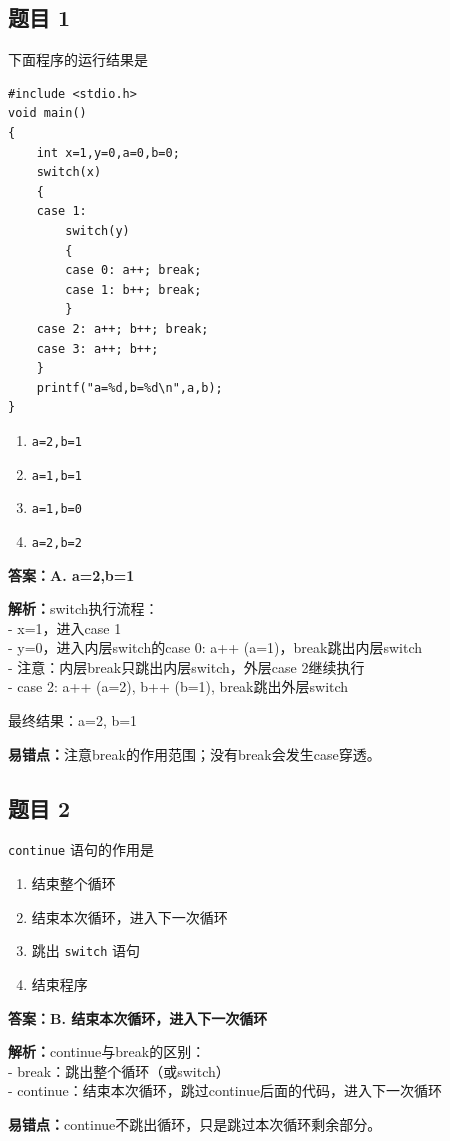 \documentclass[12pt,a4paper]{ctexart}
\begin{document}
\subsection*{题目 1}
下面程序的运行结果是
\begin{lstlisting}
#include <stdio.h>
void main()
{
    int x=1,y=0,a=0,b=0;
    switch(x)
    {
    case 1:
        switch(y)
        {
        case 0: a++; break;
        case 1: b++; break;
        }
    case 2: a++; b++; break;
    case 3: a++; b++;
    }
    printf("a=%d,b=%d\n",a,b);
}
\end{lstlisting}

\begin{enumerate}[label=\Alph*.]
	\item \texttt{a=2,b=1}
	\item \texttt{a=1,b=1}
	\item \texttt{a=1,b=0}
	\item \texttt{a=2,b=2}
\end{enumerate}

\begin{answerbox}
	\textbf{答案：A. a=2,b=1}

	\textbf{解析：}switch执行流程：\\
	- x=1，进入case 1\\
	- y=0，进入内层switch的case 0: a++ (a=1)，break跳出内层switch\\
	- 注意：内层break只跳出内层switch，外层case 2继续执行\\
	- case 2: a++ (a=2), b++ (b=1), break跳出外层switch

	最终结果：a=2, b=1

	\textbf{易错点：}注意break的作用范围；没有break会发生case穿透。
\end{answerbox}

\subsection*{题目 2}
\texttt{continue} 语句的作用是
\begin{enumerate}[label=\Alph*.]
	\item 结束整个循环
	\item 结束本次循环，进入下一次循环
	\item 跳出 \texttt{switch} 语句
	\item 结束程序
\end{enumerate}

\begin{answerbox}
	\textbf{答案：B. 结束本次循环，进入下一次循环}

	\textbf{解析：}continue与break的区别：\\
	- break：跳出整个循环（或switch）\\
	- continue：结束本次循环，跳过continue后面的代码，进入下一次循环

	\textbf{易错点：}continue不跳出循环，只是跳过本次循环剩余部分。
\end{answerbox}
\end{document}
